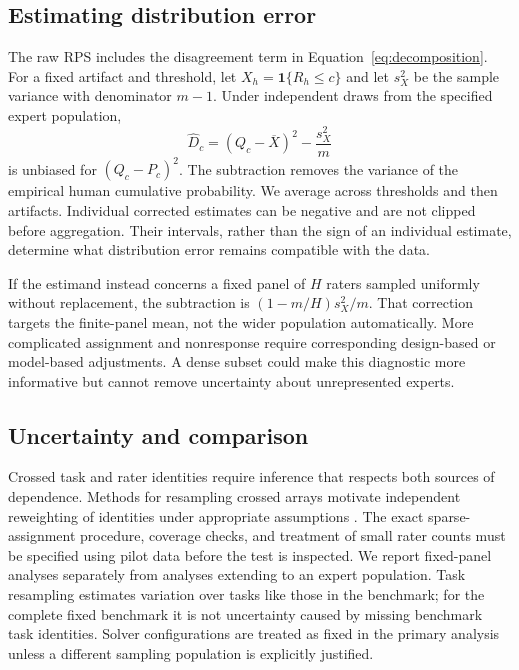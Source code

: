 \subsection{Estimating distribution error}
The raw RPS includes the disagreement term in Equation~\ref{eq:decomposition}.
For a fixed artifact and threshold, let $X_h=\mathbf1\{R_h\leq c\}$ and let $s_X^2$ be the sample variance with denominator $m-1$.
Under independent draws from the specified expert population,
\begin{equation}
 \widehat D_c=(Q_c-\overline X)^2-\frac{s_X^2}{m}
 \label{eq:corrected}
\end{equation}
is unbiased for $(Q_c-P_c)^2$.
The subtraction removes the variance of the empirical human cumulative probability.
We average across thresholds and then artifacts.
Individual corrected estimates can be negative and are not clipped before aggregation.
Their intervals, rather than the sign of an individual estimate, determine what distribution error remains compatible with the data.

If the estimand instead concerns a fixed panel of $H$ raters sampled uniformly without replacement, the subtraction is $(1-m/H)s_X^2/m$.
That correction targets the finite-panel mean, not the wider population automatically.
More complicated assignment and nonresponse require corresponding design-based or model-based adjustments.
A dense subset could make this diagnostic more informative but cannot remove uncertainty about unrepresented experts.

\subsection{Uncertainty and comparison}
Crossed task and rater identities require inference that respects both sources of dependence.
Methods for resampling crossed arrays motivate independent reweighting of identities under appropriate assumptions \citep{owen2012bootstrapping}.
The exact sparse-assignment procedure, coverage checks, and treatment of small rater counts must be specified using pilot data before the test is inspected.
We report fixed-panel analyses separately from analyses extending to an expert population.
Task resampling estimates variation over tasks like those in the benchmark; for the complete fixed benchmark it is not uncertainty caused by missing benchmark task identities.
Solver configurations are treated as fixed in the primary analysis unless a different sampling population is explicitly justified.

